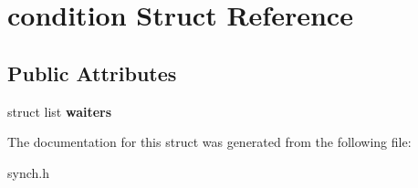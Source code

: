 \hypertarget{structcondition}{}\section{condition Struct Reference}
\label{structcondition}
\subsection*{Public Attributes}
\begin{DoxyCompactItemize}
\item 
struct list {\bfseries waiters}\hypertarget{structcondition_a85e047c99fb328f32b7e61c9565d1ca7}{}\label{structcondition_a85e047c99fb328f32b7e61c9565d1ca7}

\end{DoxyCompactItemize}


The documentation for this struct was generated from the following file\+:\begin{DoxyCompactItemize}
\item 
synch.\+h\end{DoxyCompactItemize}
